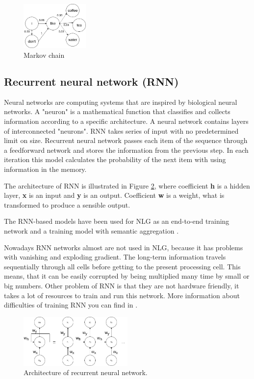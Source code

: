 \begin{figure}[hbt]
  \centering
  \includegraphics[width=0.3\textwidth]{figures/MarkovChain.png}
  \caption{Markov chain}
  \label{markov_chain}
\end{figure}

\subsection{Recurrent neural network (RNN)}
Neural networks are computing systems that are inspired by biological neural networks. A "neuron" is a mathematical function that classifies and collects information according to a specific architecture. A neural network contains layers of interconnected "neurons". RNN takes series of input with no predetermined limit on size. Recurrent neural network passes each item of the sequence through a feedforward network and stores the information from the previous step. In each iteration this model calculates the probability of the next item with using information in the memory.

The architecture of RNN is illustrated in Figure \ref{rnn}, where coefficient \textbf{h} is a hidden layer, \textbf{x} is an input and \textbf{y} is an output. Coefficient \textbf{w} is a weight, what is transformed to produce a sensible output.

The RNN-based models have been used for NLG as an end-to-end training network \cite{network_nlg} and a training model with semantic aggregation \cite{rnn_nlg}. 

Nowadays RNN networks almost are not used in NLG, because it has problems with vanishing and exploding gradient. The long-term information travels sequentially  through all cells before getting to the present processing cell. This means, that it can be easily corrupted by being multiplied many time by small or big numbers. Other problem of RNN is that they are not hardware friendly, it takes a lot of resources to train and run this network. More information about difficulties of training RNN you can find in \cite{rnn_difficulties}.

\begin{figure}[hbt]
  \centering
  \includegraphics[width=0.5\textwidth]{figures/rnn.jpg}
  \caption{Architecture of recurrent neural network.}
  \label{rnn}
\end{figure}


